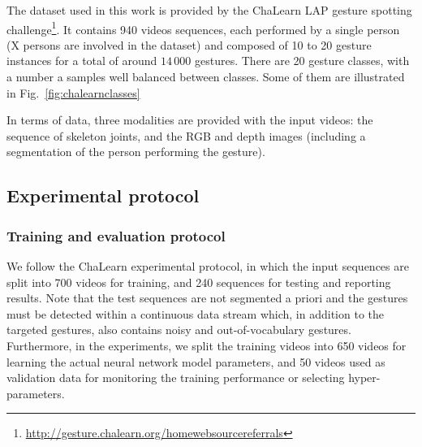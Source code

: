 
The dataset used in this work is provided by the ChaLearn LAP \cite{chalearnLAP} gesture spotting challenge\footnote{\href{http://gesture.chalearn.org/homewebsourcereferrals}{http://gesture.chalearn.org/homewebsourcereferrals}}.
%
It contains 940 videos sequences, each performed by a single person (X persons are involved in the dataset)
and composed of 10 to 20 gesture instances for a total of around $14\,000$ gestures.
%
There are 20 gesture classes, with a number a samples well balanced between classes. Some of them are illustrated in Fig.~\ref{fig:chalearnclasses}


In terms of data, three modalities are provided with the input videos: the sequence of skeleton joints, and the RGB and depth images
(including a segmentation of the person performing the gesture).




\subsection{Experimental protocol}

\subsubsection{Training and evaluation protocol}

We follow the ChaLearn experimental protocol, in which the input sequences are split into 700 videos for training, and 240 sequences for testing and reporting results.
Note that the   test sequences  are not segmented a priori and the gestures must be detected within a continuous data stream
which, in addition to the targeted gestures, also contains noisy and out-of-vocabulary gestures.
%
Furthermore, in the experiments, we split the training videos into 650 videos for learning the actual neural network model parameters, and 50 videos
used as validation data for monitoring the training performance or selecting hyper-parameters.


